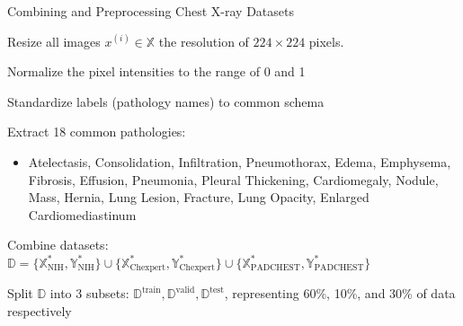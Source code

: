 \documentclass[review,1p,times,numbers]{elsarticle}
\newenvironment{SgAlgorithm}[1][t]
{%
	\begin{algorithm2e}[#1]
    \linespread{1.2}
    \selectfont
}
{\end{algorithm2e}}
\begin{document}
\begin{SgAlgorithm}
    \caption{Combining and Preprocessing Chest X-ray Datasets}\label{alg:taxonomy.dataset}
    \BlankLine%

    \Fn{}
    {%
        {%
            Resize all images $x^{(i)} \in \mathbb{X}$ the resolution of $224 \times 224$ pixels. \;
            \BlankLine%

            Normalize the pixel intensities to the range of 0 and 1
        }
    }
    \BlankLine%

    \Fn{}
    {%
        {%
            Standardize labels (pathology names) to common schema \;
            \BlankLine%

            Extract 18 common pathologies:
            \begin{itemize}
                \item Atelectasis, Consolidation, Infiltration, Pneumothorax, Edema, Emphysema, Fibrosis, Effusion, Pneumonia, Pleural Thickening, Cardiomegaly, Nodule, Mass, Hernia, Lung Lesion, Fracture, Lung Opacity, Enlarged Cardiomediastinum
            \end{itemize}
        }
    }
    \BlankLine%

    \Fn{}
    {%
        Combine datasets: $\mathbb{D} = \{ \mathbb{X}_{\text{NIH}}^{*}, \mathbb{Y}_{\text{NIH}}^{*} \}
        \cup
        \{ \mathbb{X}_{\text{Chexpert}}^{*}, \mathbb{Y}_{\text{Chexpert}}^{*} \}
        \cup
        \{ \mathbb{X}_{\text{PADCHEST}}^{*}, \mathbb{Y}_{\text{PADCHEST}}^{*} \}$
        \BlankLine%

        Split $\mathbb{D}$ into 3 subsets: $\mathbb{D}^\text{train}, \mathbb{D}^\text{valid}, \mathbb{D}^\text{test}$, representing 60\%, 10\%, and 30\% of data respectively
    }
    \BlankLine%
\end{SgAlgorithm}
\end{document}
